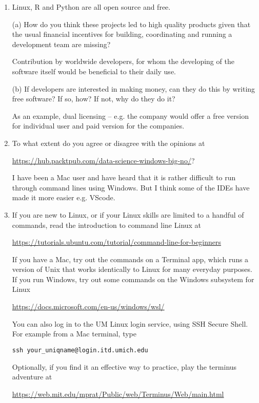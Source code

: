 \documentclass[12pt]{article}
\begin{document}
\begin{enumerate}

\item Linux, R and Python are all open source and free. 

(a) How do you think these projects led to high quality products given that the  usual financial incentives for building, coordinating and running a development team are missing?

Contribution by worldwide developers, for whom the developing of the software itself would be beneficial to their daily use.

(b) If developers are interested in making money, can they do this by writing free software? If so, how? If not, why do they do it?

As an example, dual licensing -- e.g. the company would offer a free version for individual user and paid version for the companies.
  
\item To what extent do you agree or disagree with the opinions at

\url{https://hub.packtpub.com/data-science-windows-big-no/}? 

I have been a Mac user and have heard that it is rather difficult to run through command lines using Windows. But I think some of the IDEs have made it more easier e.g. VScode.

\item If you are new to Linux, or if your Linux skills are limited to a handful of commands, read the introduction to command line Linux at
  
\url{https://tutorials.ubuntu.com/tutorial/command-line-for-beginners}

If you have a Mac, try out the commands on a Terminal app, which runs a version of Unix that works identically to Linux for many everyday purposes. If you run Windows, try out some commands on the Windows subsystem for Linux

\url{https://docs.microsoft.com/en-us/windows/wsl/}

You can also log in to the UM Linux login service, using SSH Secure Shell. For example from a Mac terminal, type

\texttt{ssh your\_uniqname@login.itd.umich.edu}

Optionally, if you find it an effective way to practice, play the terminus adventure at

\url{https://web.mit.edu/mprat/Public/web/Terminus/Web/main.html}


\end{enumerate}
\end{document}
